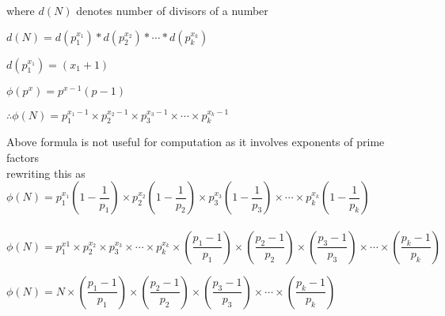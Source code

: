 \documentclass[12pt]{article}
\begin{document}
		where $d(N)$ denotes number of divisors of a number


		$d(N) = d(p_1^{x_1}) * d(p_2^{x_2}) * \cdots * d(p_k^{x_k})$

		$d(p_1^{x_1}) = (x_1 + 1)$

		$\phi(p^x) = p^{x - 1} (p - 1)$

		$\therefore \phi(N) = p_1^{x_1 - 1} \times p_2^{x_2 - 1} \times p_3^{x_3 - 1} \times \cdots \times p_k^{x_k - 1}$

	Above formula is not useful for computation as it involves exponents of prime factors \\
		
	rewriting this as \\

	$\phi(N) = p_1^{x_1} \left(1 - \dfrac{1}{p_1}\right) \times p_2^{x_2} \left(1 - \dfrac{1}{p_2}\right) \times p_3^{x_3} \left(1 - \dfrac{1}{p_3}\right) \times \cdots \times p_k^{x_k} \left(1 - \dfrac{1}{p_k}\right)$
	\\ \\
	$\phi(N) = p_1^{x1} \times p_2^{x_2} \times p_3^{x_3} \times \cdots \times p_k^{x_k} \times \left(\dfrac{p_1 - 1}{p_1}\right) \times \left(\dfrac{p_2 - 1}{p_2} \right) \times \left(\dfrac{p_3 - 1}{p_3} \right) \times \cdots \times \left(\dfrac{p_k - 1}{p_k} \right)$

	$\phi(N) = N \times \left(\dfrac{p_1 - 1}{p_1}\right) \times \left(\dfrac{p_2 - 1}{p_2} \right) \times \left(\dfrac{p_3 - 1}{p_3} \right) \times \cdots \times \left(\dfrac{p_k - 1}{p_k} \right)$
\end{document}
